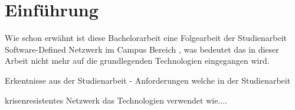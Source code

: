 \section{Einführung}
Wie schon erwähnt ist diese Bachelorarbeit eine Folgearbeit der Studienarbeit Software-Defined Netzwerk im Campus Bereich \cite{studienarbeit}, was bedeutet das in dieser Arbeit nicht mehr auf die grundlegenden Technologien eingegangen wird.



Erkentnisse aus der Studienarbeit - Anforderungen welche in der Studienarbeit

krisenresistentes Netzwerk das Technologien verwendet wie....